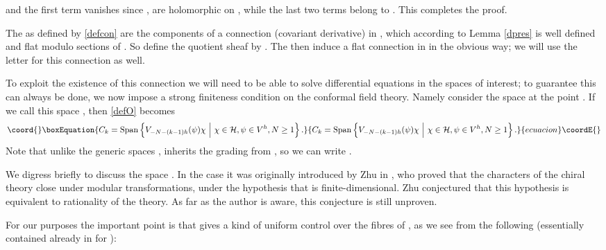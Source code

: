 \documentclass[a4paper,12pt]{article}
\providecommand{\Span}{\mathrm{Span}}
\providecommand{\uu}{{\mathbf u}}
\providecommand{\PP}{{\mathbb P}}
\providecommand{\F}{{\mathcal H}}
\providecommand{\done}{\myHighlight{$\hfill \hfill \blacksquare$}\coordHE{} \bigskip}
\begin{document}
and the first term vanishes since \coordHE{}, \coordHE{} are holomorphic on \myHighlight{$\PP - \{ 0 \}$}\coordHE{}, 
while the last two terms belong to \myHighlight{$O_\uu$}\coordHE{}.  This completes the proof. \done

The \coordHE{} as defined by \eqref{defcon} are the components of a connection (covariant derivative) in \coordHE{}, which
according to Lemma \eqref{dpres} is well defined and flat modulo sections of \coordHE{}.
So define the quotient sheaf \coordHE{} by \coordHE{}.
The \coordHE{} then induce a flat connection in \coordHE{}
in the obvious way; we will use the letter \coordHE{} for this connection as well.

To exploit the existence of this connection we will need to be able to solve differential equations
in the spaces of interest; to guarantee this can always be done, we now impose a strong
finiteness condition on the conformal field theory.  Namely consider the space 
\myHighlight{$O_\uu$}\coordHE{} at the point \myHighlight{$\uu = (\infty, \dots, \infty)$}\coordHE{}.  If we call this space \coordHE{}, then \eqref{defO} becomes
\begin{equation}\coord{}\boxEquation{ \label{defC}
C_k = \Span\left\{ V_{-N-(k-1)h}(\psi) \chi \ \Big\vert \ \chi \in \F, \psi \in V^h, N \ge 1 \right\}.
}{ C_k = \Span\left\{ V_{-N-(k-1)h}(\psi) \chi \ \Big\vert \ \chi \in \F, \psi \in V^h, N \ge 1 \right\}.
}{ecuacion}\coordE{}\end{equation}
Note that unlike the generic spaces \myHighlight{$O_\uu$}\coordHE{}, \coordHE{} inherits the grading from \myHighlight{$\F$}\coordHE{}, so we can write \coordHE{}.

We digress briefly to discuss the space \coordHE{}.  In the case \coordHE{} it was originally introduced by Zhu in \cite{Zhu}, who
proved that the characters of the chiral theory close under modular transformations, under the 
hypothesis that \myHighlight{$\F / C_2$}\coordHE{} is finite-dimensional.  Zhu conjectured that this hypothesis is equivalent to
rationality of the theory.  As far as the author is aware, this conjecture is still unproven.

For our purposes the important point is that 
\coordHE{} gives a kind of uniform control over the fibres of \coordHE{}, as we see from the following (essentially contained
already in \cite{Zhu} for \coordHE{}):
\end{document}
